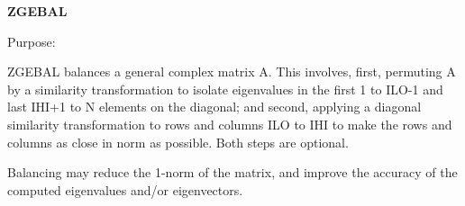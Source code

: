 {\bfseries Z\+G\+E\+B\+A\+L} 

 \begin{DoxyParagraph}{Purpose\+: }
\begin{DoxyVerb} ZGEBAL balances a general complex matrix A.  This involves, first,
 permuting A by a similarity transformation to isolate eigenvalues
 in the first 1 to ILO-1 and last IHI+1 to N elements on the
 diagonal; and second, applying a diagonal similarity transformation
 to rows and columns ILO to IHI to make the rows and columns as
 close in norm as possible.  Both steps are optional.

 Balancing may reduce the 1-norm of the matrix, and improve the
 accuracy of the computed eigenvalues and/or eigenvectors.\end{DoxyVerb}
 
\end{DoxyParagraph}

